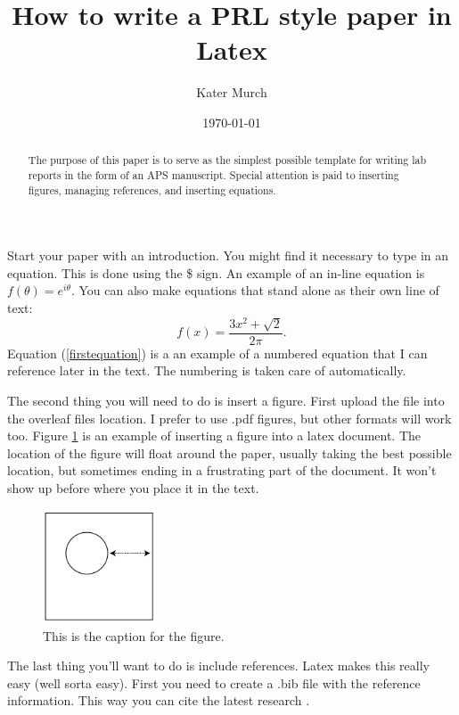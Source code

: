 \documentclass[prl,twocolumn,english,superscriptaddress,floatfix]{revtex4}
\begin{document}
\title{How to write a PRL style paper in Latex}
\author{Kater Murch}

\date{\today}

\begin{abstract}
The purpose of this paper is to serve as the simplest possible template for writing lab reports in the form of an APS manuscript. Special attention is paid to inserting figures, managing references, and inserting equations.
\end{abstract}
\maketitle

Start your paper with an introduction. You might find it necessary to type in an equation. This is done using the \$ sign.  
An example of an in-line equation is $f(\theta) = e^{i\theta}$.  You can also make equations that stand alone as their own line of text:
\begin{equation}
f(x) = \frac{3 x^2 + \sqrt{2}}{2 \pi}.  \label{firstequation}
\end{equation}
Equation (\ref{firstequation}) is a an example of a numbered equation that I can reference later in the text.  The numbering is taken care of automatically.

The second thing you will need to do is insert a figure.  First upload the file into the overleaf files location. I prefer to use .pdf figures, but other formats will work too. Figure \ref{figboxcircle} is an example of inserting a figure into a latex document. The location of the figure will float around the paper, usually taking the best possible location, but sometimes ending in a frustrating part of the document. It won't show up before where you place it in the text.

\begin{figure}
\begin{center}
\includegraphics[width = 0.3\textwidth]{myfigure.pdf}
\end{center}
\caption{ This is the caption for the figure.}
\label{figboxcircle}
\end{figure}

The last thing you'll want to do is include references. Latex makes this really easy (well sorta easy).  First you need to create a .bib file with the reference information.  This way you can cite the latest research \cite{seig17,bert17}.


\end{document}
